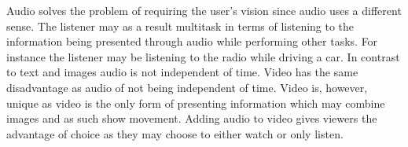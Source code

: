 Audio solves the problem of requiring the user's vision since audio uses a different sense. The listener may as a result multitask in terms of listening to the information being presented through audio while performing other tasks. For instance the listener may be listening to the radio while driving a car. In contrast to text and images audio is not independent of time. Video has the same disadvantage as audio of not being independent of time. Video is, however, unique as video is the only form of presenting information which may combine images and as such show movement. Adding audio to video gives viewers the advantage of choice as they may choose to either watch or only listen.